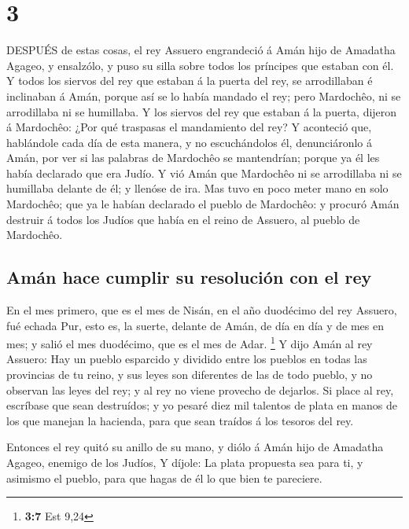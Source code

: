\hypertarget{section-2}{%
\section{3}\label{section-2}}

 DESPUÉS de estas cosas, el rey Assuero engrandeció á Amán
hijo de Amadatha Agageo, y ensalzólo, y puso su silla sobre todos los
príncipes que estaban con él.  Y todos los siervos del rey
que estaban á la puerta del rey, se arrodillaban é inclinaban á Amán,
porque así se lo había mandado el rey; pero Mardochêo, ni se arrodillaba
ni se humillaba.  Y los siervos del rey que estaban á la
puerta, dijeron á Mardochêo: ¿Por qué traspasas el mandamiento del rey?
 Y aconteció que, hablándole cada día de esta manera, y no
escuchándolos él, denunciáronlo á Amán, por ver si las palabras de
Mardochêo se mantendrían; porque ya él les había declarado que era
Judío.  Y vió Amán que Mardochêo ni se arrodillaba ni se
humillaba delante de él; y llenóse de ira.  Mas tuvo en poco
meter mano en solo Mardochêo; que ya le habían declarado el pueblo de
Mardochêo: y procuró Amán destruir á todos los Judíos que había en el
reino de Assuero, al pueblo de Mardochêo.

\hypertarget{amuxe1n-hace-cumplir-su-resoluciuxf3n-con-el-rey}{%
\subsection{Amán hace cumplir su resolución con el
rey}\label{amuxe1n-hace-cumplir-su-resoluciuxf3n-con-el-rey}}

 En el mes primero, que es el mes de Nisán, en el año
duodécimo del rey Assuero, fué echada Pur, esto es, la suerte, delante
de Amán, de día en día y de mes en mes; y salió el mes duodécimo, que es
el mes de Adar. \footnote{\textbf{3:7} Est 9,24}  Y dijo
Amán al rey Assuero: Hay un pueblo esparcido y dividido entre los
pueblos en todas las provincias de tu reino, y sus leyes son diferentes
de las de todo pueblo, y no observan las leyes del rey; y al rey no
viene provecho de dejarlos.  Si place al rey, escríbase que
sean destruídos; y yo pesaré diez mil talentos de plata en manos de los
que manejan la hacienda, para que sean traídos á los tesoros del rey.

 Entonces el rey quitó su anillo de su mano, y diólo á Amán
hijo de Amadatha Agageo, enemigo de los Judíos,  Y díjole:
La plata propuesta sea para ti, y asimismo el pueblo, para que hagas de
él lo que bien te pareciere.

